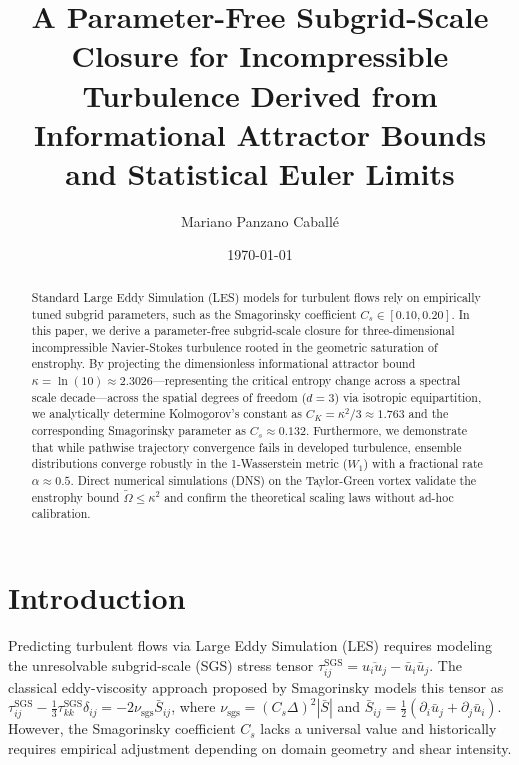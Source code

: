 \documentclass[twocolumn,10pt,aps,pre,superscriptaddress]{revtex4-2}
\begin{document}
\title{A Parameter-Free Subgrid-Scale Closure for Incompressible Turbulence Derived from Informational Attractor Bounds and Statistical Euler Limits}

\author{Mariano Panzano Caball\'e}

\date{\today}

\begin{abstract}
Standard Large Eddy Simulation (LES) models for turbulent flows rely on empirically tuned subgrid parameters, such as the Smagorinsky coefficient $C_s \in [0.10, 0.20]$. In this paper, we derive a parameter-free subgrid-scale closure for three-dimensional incompressible Navier-Stokes turbulence rooted in the geometric saturation of enstrophy. By projecting the dimensionless informational attractor bound $\kappa = \ln(10) \approx 2.3026$---representing the critical entropy change across a spectral scale decade---across the spatial degrees of freedom ($d=3$) via isotropic equipartition, we analytically determine Kolmogorov's constant as $C_K = \kappa^2/3 \approx 1.763$ and the corresponding Smagorinsky parameter as $C_s \approx 0.132$. Furthermore, we demonstrate that while pathwise trajectory convergence fails in developed turbulence, ensemble distributions converge robustly in the 1-Wasserstein metric ($W_1$) with a fractional rate $\alpha \approx 0.5$. Direct numerical simulations (DNS) on the Taylor-Green vortex validate the enstrophy bound $\widetilde{\Omega} \le \kappa^2$ and confirm the theoretical scaling laws without ad-hoc calibration.
\end{abstract}

\maketitle

\section{Introduction}
Predicting turbulent flows via Large Eddy Simulation (LES) requires modeling the unresolvable subgrid-scale (SGS) stress tensor $\tau_{ij}^{\text{SGS}} = \overline{u_i u_j} - \bar{u}_i \bar{u}_j$. The classical eddy-viscosity approach proposed by Smagorinsky \cite{Smag63} models this tensor as $\tau_{ij}^{\text{SGS}} - \frac{1}{3}\tau_{kk}^{\text{SGS}}\delta_{ij} = -2 \nu_{\text{sgs}} \bar{S}_{ij}$, where $\nu_{\text{sgs}} = (C_s \Delta)^2 |\bar{S}|$ and $\bar{S}_{ij} = \frac{1}{2}(\partial_i \bar{u}_j + \partial_j \bar{u}_i)$. However, the Smagorinsky coefficient $C_s$ lacks a universal value and historically requires empirical adjustment depending on domain geometry and shear intensity.
\end{document}

